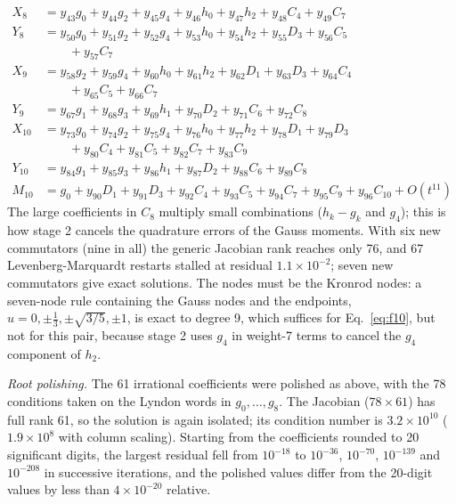 \documentclass[12pt]{article}
\begin{document}
\begin{equation}
\begin{aligned}
X_{8}&=y_{43}g_{0}+y_{44}g_{2}+y_{45}g_{4}+y_{46}h_{0}+y_{47}h_{2}+y_{48}C_{4}+y_{49}C_{7}\\
Y_{8}&=y_{50}g_{0}+y_{51}g_{2}+y_{52}g_{4}+y_{53}h_{0}+y_{54}h_{2}+y_{55}D_{3}+y_{56}C_{5}\\
&\qquad+y_{57}C_{7}\\
X_{9}&=y_{58}g_{2}+y_{59}g_{4}+y_{60}h_{0}+y_{61}h_{2}+y_{62}D_{1}+y_{63}D_{3}+y_{64}C_{4}\\
&\qquad+y_{65}C_{5}+y_{66}C_{7}\\
Y_{9}&=y_{67}g_{1}+y_{68}g_{3}+y_{69}h_{1}+y_{70}D_{2}+y_{71}C_{6}+y_{72}C_{8}\\
X_{10}&=y_{73}g_{0}+y_{74}g_{2}+y_{75}g_{4}+y_{76}h_{0}+y_{77}h_{2}+y_{78}D_{1}+y_{79}D_{3}\\
&\qquad+y_{80}C_{4}+y_{81}C_{5}+y_{82}C_{7}+y_{83}C_{9}\\
Y_{10}&=y_{84}g_{1}+y_{85}g_{3}+y_{86}h_{1}+y_{87}D_{2}+y_{88}C_{6}+y_{89}C_{8}\\
M_{10}&=g_{0}+y_{90}D_{1}+y_{91}D_{3}+y_{92}C_{4}+y_{93}C_{5}+y_{94}C_{7}+y_{95}C_{9}+y_{96}C_{10}+O(t^{11})
\end{aligned}\label{eq:stage2b}
\end{equation}
The large coefficients in $C_8$ multiply small combinations ($h_k-g_k$ and $g_4$); this is how stage 2 cancels the quadrature errors of the Gauss moments. With six new commutators (nine in all) the generic Jacobian rank reaches only 76, and 67 Levenberg-Marquardt restarts stalled at residual $1.1\times10^{-2}$; seven new commutators give exact solutions. The nodes must be the Kronrod nodes: a seven-node rule containing the Gauss nodes and the endpoints, $u=0,\pm\frac{1}{3},\pm\sqrt{3/5},\pm1$, is exact to degree 9, which suffices for Eq.~\ref{eq:f10}, but not for this pair, because stage 2 uses $g_4$ in weight-7 terms to cancel the $g_4$ component of $h_2$.

\emph{Root polishing.} The 61 irrational coefficients were polished as above, with the 78 conditions taken on the Lyndon words in $g_0,\ldots,g_8$. The Jacobian ($78\times61$) has full rank 61, so the solution is again isolated; its condition number is $3.2\times10^{10}$ ($1.9\times10^{8}$ with column scaling). Starting from the coefficients rounded to 20 significant digits, the largest residual fell from $10^{-18}$ to $10^{-36}$, $10^{-70}$, $10^{-139}$ and $10^{-208}$ in successive iterations, and the polished values differ from the 20-digit values by less than $4\times10^{-20}$ relative.
\end{document}
